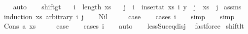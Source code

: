 \begin{isabellebody}
\ \ \isamarkupfalse%
\ auto\isanewline
\ \ \isamarkupfalse%
\isanewline
{}\isamarkupfalse%
%
\endisatagproof
{\isafoldproof}%
%
\isadelimproof
\isanewline
%
\endisadelimproof
\isanewline
\isanewline
\isanewline
{}\isamarkupfalse%
\ shift{\isacharunderscore}{\kern0pt}gt{\isacharcolon}{\kern0pt}\isanewline
\ \ \ {\isachardoublequoteopen}i\ {\isasymle}\ length\ xs{\isachardoublequoteclose}\isanewline
\ \ \ {\isachardoublequoteopen}j\ {\isacharless}{\kern0pt}\ i\ {\isacharequal}{\kern0pt}{\isacharequal}{\kern0pt}{\isachargreater}{\kern0pt}\ {\isacharparenleft}{\kern0pt}insert{\isacharunderscore}{\kern0pt}at\ xs\ i\ y{\isacharparenright}{\kern0pt}\ {\isacharbang}{\kern0pt}\ j\ {\isacharequal}{\kern0pt}\ xs\ {\isacharbang}{\kern0pt}\ j{\isachardoublequoteclose}\isanewline
%
\isadelimproof
%
\endisadelimproof
%
\isatagproof
{}\isamarkupfalse%
\ assms\isanewline
{}\isamarkupfalse%
\ {\isacharparenleft}{\kern0pt}induction\ xs\ arbitrary{\isacharcolon}{\kern0pt}\ i\ j{\isacharparenright}{\kern0pt}\isanewline
\ \ \isamarkupfalse%
\ Nil\isanewline
\ \ \isamarkupfalse%
\ \isamarkupfalse%
\ {\isacharquery}{\kern0pt}case\isanewline
\ \ \isamarkupfalse%
\ {\isacharparenleft}{\kern0pt}cases\ i{\isacharparenright}{\kern0pt}\isanewline
\ \ \isamarkupfalse%
\ simp\isanewline
\ \ \isamarkupfalse%
\ simp\isanewline
{}\isamarkupfalse%
\isanewline
\ \ \isamarkupfalse%
\ {\isacharparenleft}{\kern0pt}Cons\ a\ xs{\isacharparenright}{\kern0pt}\isanewline
\ \ \isamarkupfalse%
\ \isamarkupfalse%
\ {\isacharquery}{\kern0pt}case\isanewline
\ \ \isamarkupfalse%
\ {\isacharparenleft}{\kern0pt}cases\ i{\isacharparenright}{\kern0pt}\isanewline
\ \ \isamarkupfalse%
\ auto\isanewline
\ \ \isamarkupfalse%
\ less{\isacharunderscore}{\kern0pt}Suc{\isacharunderscore}{\kern0pt}eq{\isacharunderscore}{\kern0pt}{}{\isacharunderscore}{\kern0pt}disj\ \isamarkupfalse%
\ fastforce\isanewline
{}\isamarkupfalse%
%
\endisatagproof
{\isafoldproof}%
%
\isadelimproof
\isanewline
%
\endisadelimproof
\isanewline
\isanewline
\isanewline
{}\isamarkupfalse%
\ shift{\isacharunderscore}{\kern0pt}lt{\isacharcolon}{\kern0pt}\isanewline

\end{isabellebody}
